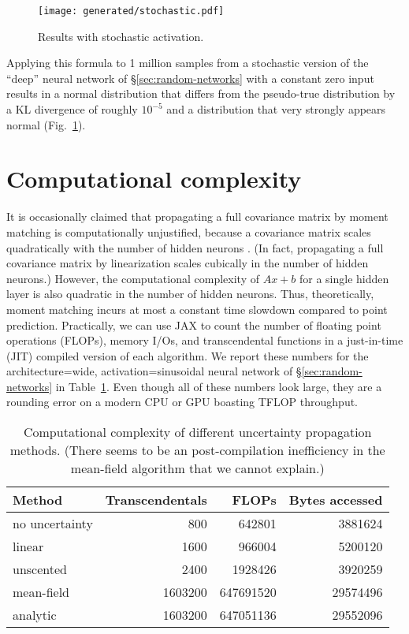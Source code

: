 \documentclass{article}
\begin{document}
\begin{figure}
  \begin{center}
    \texttt{[image: generated/stochastic.pdf]}
  \end{center}
  \caption{\label{fig:stochastic} Results with stochastic activation.}
\end{figure}

Applying this formula to 1 million samples from a stochastic version of the ``deep'' neural network of \S\ref{sec:random-networks} with a constant zero input results in a normal distribution that differs from the pseudo-true distribution by a KL divergence of roughly \(10^{-5}\)
 and a distribution that very strongly appears normal (Fig.~\ref{fig:stochastic}).

\section{Computational complexity}
It is occasionally claimed that propagating a full covariance matrix by moment matching is computationally unjustified, because a covariance matrix scales quadratically with the number of hidden neurons \citep[\S5]{akgul_deterministic_2025}.
(In fact, propagating a full covariance matrix by linearization scales cubically in the number of hidden neurons.)
However, the computational complexity of \(Ax + b\) for a single hidden layer is also quadratic in the number of hidden neurons.
Thus, theoretically, moment matching incurs at most a constant time slowdown compared to point prediction.
Practically, we can use JAX to count the number of floating point operations (FLOPs), memory I/Os, and transcendental functions in a just-in-time (JIT) compiled version of each algorithm.
We report these numbers for the architecture=wide, activation=sinusoidal neural network of \S\ref{sec:random-networks} in Table~\ref{tab:complexity}.
Even though all of these numbers look large, they are a rounding error on a modern CPU or GPU boasting TFLOP throughput.

\begin{table}
\begin{center}
  \begin{tabular}{lrrr}
  \toprule
  Method & Transcendentals & FLOPs & Bytes accessed\\
  \midrule
  no uncertainty & 800 & 642801 & 3881624
  \\
  \midrule
  linear & 1600 & 966004 & 5200120 \\
  unscented & 2400 & 1928426 & 3920259 \\
  mean-field & 1603200 & 647691520 & 29574496 \\
  analytic & 1603200   & 647051136 & 29552096 \\
  \bottomrule
  \end{tabular}
\end{center}
\caption{\label{tab:complexity} Computational complexity of different uncertainty propagation methods. (There seems to be an post-compilation inefficiency in the mean-field algorithm that we cannot explain.)}
\end{table}
\end{document}
